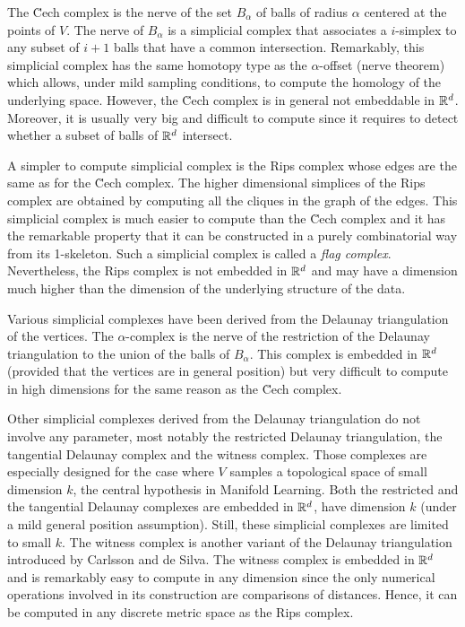 The \u{C}ech complex is the nerve of the set $B_{\alpha}$ of balls of
radius $\alpha$ centered at the points of $V$. The nerve of
$B_{\alpha}$  is a simplicial complex that associates a
$i$-simplex to any subset of $i+1$ balls that have a common
intersection. Remarkably, this simplicial
complex  has the same homotopy type as the $\alpha$-offset (nerve theorem) which allows,  under mild sampling conditions, to compute the homology of the underlying space. However,
the \u{C}ech complex is in general not embeddable in $\mathbb R ^d$. Moreover, it is usually very big and
difficult to compute since it requires to detect whether a subset of
balls of  $\mathbb R ^d$ intersect. 

A simpler to compute simplicial complex is the Rips complex whose edges are the same as for the \u{C}ech complex. The higher dimensional simplices of the Rips complex are obtained by computing all the cliques in the graph of the edges. This simplicial complex is much easier to compute than the \u{C}ech complex and it has the remarkable property that it can be constructed in a purely combinatorial way from its 1-skeleton.  Such a simplicial complex is called a {\em flag
  complex}. Nevertheless, the Rips complex is not embedded in $\mathbb R ^d$
and may have a dimension much higher than the dimension of the underlying structure
of the data.


Various simplicial complexes have been derived from the Delaunay
triangulation of the vertices. The $\alpha$-complex is the nerve of
the restriction of the Delaunay triangulation to the union of the
balls of $B_{\alpha}$. This complex is embedded in $\mathbb R^d$ (provided
that the vertices are in general position) but very difficult to
compute in high dimensions for the same reason as the \u{C}ech complex.

Other simplicial complexes derived from the Delaunay triangulation do
not involve any parameter, most notably the restricted Delaunay
triangulation, the tangential Delaunay complex and the witness
complex. Those complexes are
especially designed for the case where $V$ samples a topological space
of small dimension $k$, the central hypothesis in Manifold
Learning. Both the restricted and the tangential Delaunay complexes are embedded in $\mathbb R^d$, have dimension $k$
(under a mild general position assumption). Still, these simplicial
complexes are limited to small $k$.  The witness complex is
another variant of the Delaunay triangulation introduced by
Carlsson and de Silva. The witness complex is embedded in $\mathbb R ^d$
and is remarkably easy to compute in any dimension
since the only numerical operations involved in its construction are
comparisons of distances. Hence, it can be computed in any discrete metric
space as the  Rips complex.

